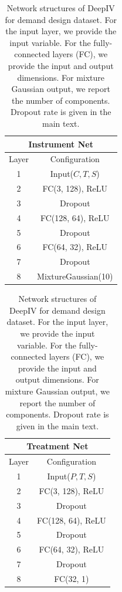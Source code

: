 \begingroup
\renewcommand{\arraystretch}{1.2}
\begin{table}[t]
    \caption{Network structures of DeepIV for demand design dataset. For the input layer, we provide the input variable. For the fully-connected layers (FC), we provide the input and output dimensions. For mixture Gaussian output, we report the number of components. Dropout rate is given in the main text.}
    
    \label{deepiv-demand-network}
    
    \begin{minipage}{0.48\hsize}
        \centering
        \begin{tabular}{cc}
            \multicolumn{2}{c}{\bf Instrument Net} 
            \\ \hline
            Layer & Configuration \\ \hline
            1 & Input($C, T, S$) \\ \hline
            2 & FC(3, 128), ReLU \\ \hline
            3 & Dropout \\ \hline
            4 & FC(128, 64), ReLU \\ \hline
            5 & Dropout \\ \hline
            6 & FC(64, 32), ReLU \\ \hline
            7 & Dropout \\ \hline
            8 & MixtureGaussian(10) \\ \hline
            \end{tabular}    
    \end{minipage}
    \hfill
    \begin{minipage}{0.48\hsize}
        \centering
        \begin{tabular}{cc}
            \multicolumn{2}{c}{\bf Treatment Net} 
            \\ \hline
            Layer & Configuration \\ \hline
            1 & Input($P, T, S$) \\ \hline
            2 & FC(3, 128), ReLU \\ \hline
            3 & Dropout \\ \hline
            4 & FC(128, 64), ReLU \\ \hline
            5 & Dropout \\ \hline
            6 & FC(64, 32), ReLU \\ \hline
            7 & Dropout \\ \hline
            8 & FC(32, 1)\\ \hline
            \end{tabular}    
    \end{minipage}
    
\end{table}
\endgroup  


